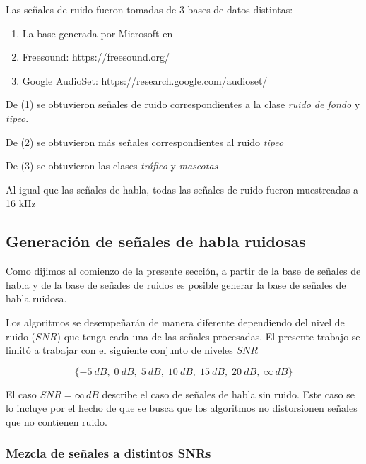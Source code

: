 Las señales de ruido fueron tomadas de 3 bases de datos distintas:

\begin{enumerate}
	\item La base generada por Microsoft en \cite{a_scalable_noisy_speech_dataset_and_online_subjective_test_framework}
	\item Freesound: https://freesound.org/
	\item Google AudioSet: https://research.google.com/audioset/
\end{enumerate}

De (1) se obtuvieron señales de ruido correspondientes a la clase \emph{ruido de fondo} y \emph{tipeo}.

De (2) se obtuvieron más señales correspondientes al ruido \emph{tipeo}

De (3) se obtuvieron las clases \emph{tráfico} y \emph{mascotas}

Al igual que las señales de habla, todas las señales de ruido fueron muestreadas a 16 kHz

\subsection{Generación de señales de habla ruidosas}
\label{sec:noisy_signals_generation}

Como dijimos al comienzo de la presente sección, a partir de la base de señales de habla y de la base de señales de ruidos es posible generar la base de señales de habla ruidosa. 

Los algoritmos se desempeñarán de manera diferente dependiendo del nivel de ruido ($SNR$) que tenga cada una de las señales procesadas. El presente trabajo se limitó a trabajar con el siguiente conjunto de niveles $SNR$

\begin{equation*}
	\{ \SI{-5}{dB}, \; \SI{0}{dB}, \; \SI{5}{dB}, \; \SI{10}{dB}, \; \SI{15}{dB}, \; \SI{20}{dB}, \; \infty \, \si{dB} \}
\end{equation*}

El caso $SNR = \infty \, \si{dB}$ describe el caso de señales de habla sin ruido. Este caso se lo incluye por el hecho de que se busca que los algoritmos no distorsionen señales que no contienen ruido.

\subsubsection{Mezcla de señales a distintos SNRs}

